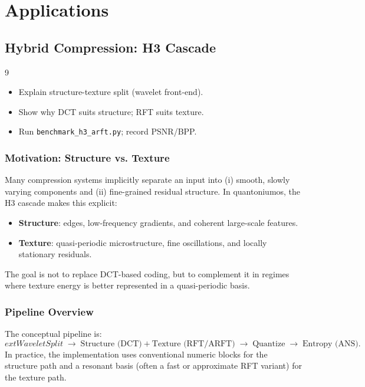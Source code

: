 \documentclass[11pt, a4paper, openany]{book}
\theoremstyle{definition}
\begin{document}
\part{Applications}

\chapter{Hybrid Compression: H3 Cascade}

\begin{todobox}{9}
\begin{itemize}
    \item[$\square$] Explain structure-texture split (wavelet front-end).
    \item[$\square$] Show why DCT suits structure; RFT suits texture.
    \item[$\square$] Run \texttt{benchmark\_h3\_arft.py}; record PSNR/BPP.
\end{itemize}
\end{todobox}

\section{Motivation: Structure vs. Texture}
Many compression systems implicitly separate an input into (i) smooth, slowly varying components and (ii) fine-grained residual structure. In quantoniumos, the H3 cascade makes this explicit:
\begin{itemize}
    \item \textbf{Structure}: edges, low-frequency gradients, and coherent large-scale features.
    \item \textbf{Texture}: quasi-periodic microstructure, fine oscillations, and locally stationary residuals.
\end{itemize}
The goal is not to replace DCT-based coding, but to complement it in regimes where texture energy is better represented in a quasi-periodic basis.

\section{Pipeline Overview}
The conceptual pipeline is:
\begin{equation}
	ext{Wavelet Split} \;\to\; \text{Structure (DCT)} + \text{Texture (RFT/ARFT)} \;\to\; \text{Quantize} \;\to\; \text{Entropy (ANS)}.
\end{equation}
In practice, the implementation uses conventional numeric blocks for the structure path and a resonant basis (often a fast or approximate RFT variant) for the texture path.
\end{document}
